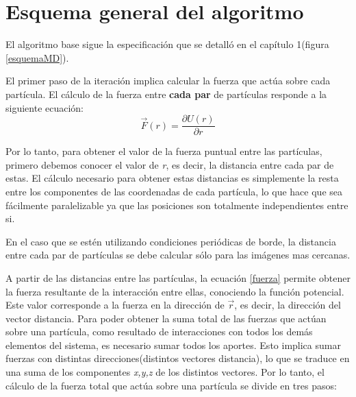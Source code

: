 \section{Esquema general del algoritmo}

El algoritmo base sigue la especificación que se detalló en el capítulo 1(figura \ref{esquemaMD}). 

El primer paso de la iteración implica calcular la fuerza que actúa sobre cada partícula. 
El cálculo de la fuerza entre \textbf{cada par} de partículas responde a la siguiente ecuación: \begin{equation} \label{fuerza}\vec{F}(r)=\dfrac{\partial U(r)}{ \partial r}\end{equation}
  
Por lo tanto, para obtener el valor de la fuerza puntual entre las partículas, primero debemos conocer el valor de \textit{r}, es decir, la distancia entre cada par de estas. 
El cálculo necesario para obtener estas distancias es simplemente la resta entre los componentes de las coordenadas de cada partícula, lo que hace que sea fácilmente paralelizable 
ya que las posiciones son totalmente independientes entre si. 

En el caso que se estén utilizando condiciones periódicas de borde, la distancia entre cada par de partículas se debe calcular sólo para las imágenes mas cercanas.

A partir de las distancias entre las partículas, la ecuación \ref{fuerza} permite obtener la fuerza resultante de la interacción entre ellas, conociendo la función potencial.
Este valor corresponde a la fuerza en la dirección de $\vec{r}$, es decir, la dirección del vector distancia. 
Para poder obtener la suma total de las fuerzas que actúan sobre una partícula, como resultado de interacciones con todos los demás elementos del sistema,
es necesario sumar todos los aportes. Esto implica sumar fuerzas con distintas direcciones(distintos vectores distancia), lo que se traduce en una suma de los componentes \textit{x,y,z} de los distintos vectores. 
Por lo tanto, el cálculo de la fuerza total que actúa sobre una partícula se divide en tres pasos:

